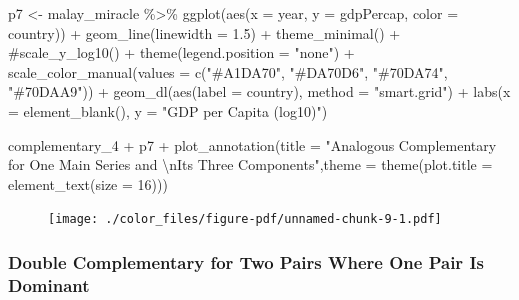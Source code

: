 \documentclass[
  letterpaper,
]{book}
\newenvironment{Shaded}{\begin{snugshade}}{\end{snugshade}}
\newcommand{\AttributeTok}[1]{\textcolor[rgb]{0.40,0.45,0.13}{#1}}
\newcommand{\CommentTok}[1]{\textcolor[rgb]{0.37,0.37,0.37}{#1}}
\newcommand{\DecValTok}[1]{\textcolor[rgb]{0.68,0.00,0.00}{#1}}
\newcommand{\FloatTok}[1]{\textcolor[rgb]{0.68,0.00,0.00}{#1}}
\newcommand{\FunctionTok}[1]{\textcolor[rgb]{0.28,0.35,0.67}{#1}}
\newcommand{\NormalTok}[1]{\textcolor[rgb]{0.00,0.23,0.31}{#1}}
\newcommand{\OtherTok}[1]{\textcolor[rgb]{0.00,0.23,0.31}{#1}}
\newcommand{\SpecialCharTok}[1]{\textcolor[rgb]{0.37,0.37,0.37}{#1}}
\newcommand{\StringTok}[1]{\textcolor[rgb]{0.13,0.47,0.30}{#1}}
\begin{document}
\begin{Shaded}
\begin{Highlighting}[]
\NormalTok{p7 }\OtherTok{\textless{}{-}}\NormalTok{ malay\_miracle }\SpecialCharTok{\%\textgreater{}\%} \FunctionTok{ggplot}\NormalTok{(}\FunctionTok{aes}\NormalTok{(}\AttributeTok{x =}\NormalTok{ year, }\AttributeTok{y =}\NormalTok{ gdpPercap, }\AttributeTok{color =}\NormalTok{ country)) }\SpecialCharTok{+} 
  \FunctionTok{geom\_line}\NormalTok{(}\AttributeTok{linewidth =} \FloatTok{1.5}\NormalTok{) }\SpecialCharTok{+} 
  \FunctionTok{theme\_minimal}\NormalTok{() }\SpecialCharTok{+} 
  \CommentTok{\#scale\_y\_log10() +}
  \FunctionTok{theme}\NormalTok{(}\AttributeTok{legend.position =} \StringTok{"none"}\NormalTok{) }\SpecialCharTok{+}
  \FunctionTok{scale\_color\_manual}\NormalTok{(}\AttributeTok{values =} \FunctionTok{c}\NormalTok{(}\StringTok{"\#A1DA70"}\NormalTok{, }\StringTok{"\#DA70D6"}\NormalTok{, }\StringTok{"\#70DA74"}\NormalTok{, }\StringTok{"\#70DAA9"}\NormalTok{)) }\SpecialCharTok{+}
  \FunctionTok{geom\_dl}\NormalTok{(}\FunctionTok{aes}\NormalTok{(}\AttributeTok{label =}\NormalTok{ country), }\AttributeTok{method =} \StringTok{"smart.grid"}\NormalTok{) }\SpecialCharTok{+}
  \FunctionTok{labs}\NormalTok{(}\AttributeTok{x =} \FunctionTok{element\_blank}\NormalTok{(), }\AttributeTok{y =} \StringTok{"GDP per Capita (log10)"}\NormalTok{)}

\NormalTok{complementary\_4 }\SpecialCharTok{+}\NormalTok{ p7 }\SpecialCharTok{+} \FunctionTok{plot\_annotation}\NormalTok{(}\AttributeTok{title =} \StringTok{"Analogous Complementary for One Main Series and }\SpecialCharTok{\textbackslash{}n}\StringTok{Its Three Components"}\NormalTok{,}\AttributeTok{theme =} \FunctionTok{theme}\NormalTok{(}\AttributeTok{plot.title =} \FunctionTok{element\_text}\NormalTok{(}\AttributeTok{size =} \DecValTok{16}\NormalTok{)))}
\end{Highlighting}
\end{Shaded}

\begin{figure}[H]

{\centering \texttt{[image: ./color\_files/figure-pdf/unnamed-chunk-9-1.pdf]}

}

\end{figure}

\hypertarget{double-complementary-for-two-pairs-where-one-pair-is-dominant}{%
\subsubsection{Double Complementary for Two Pairs Where One Pair Is
Dominant}\label{double-complementary-for-two-pairs-where-one-pair-is-dominant}}
\end{document}
